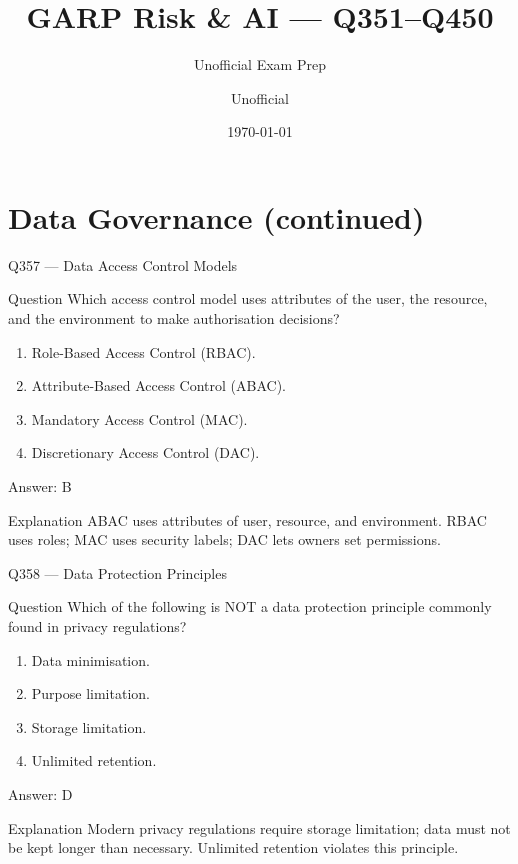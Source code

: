 \documentclass[aspectratio=169,8pt]{beamer}
\title[GARP RAI]{GARP Risk \& AI --- Q351--Q450}
\subtitle{Unofficial Exam Prep}
\author{Unofficial}
\date{\today}
\begin{document}
	
	\begin{frame}
		\titlepage
	\end{frame}
	
	\section{Data Governance (continued)}
	



	



	\begin{frame}{Q357 --- Data Access Control Models}
		\begin{block}{Question}
			Which access control model uses attributes of the user, the resource, and the environment to make authorisation decisions?
			\begin{enumerate}
				\item Role-Based Access Control (RBAC).
				\item Attribute-Based Access Control (ABAC).
				\item Mandatory Access Control (MAC).
				\item Discretionary Access Control (DAC).
			\end{enumerate}
		\end{block}
		\begin{exampleblock}{Answer: B}\end{exampleblock}
		\begin{block}{Explanation}
			ABAC uses attributes of user, resource, and environment. RBAC uses roles; MAC uses security labels; DAC lets owners set permissions.
		\end{block}
	\end{frame}
	
	\begin{frame}{Q358 --- Data Protection Principles}
		\begin{block}{Question}
			Which of the following is NOT a data protection principle commonly found in privacy regulations?
			\begin{enumerate}
				\item Data minimisation.
				\item Purpose limitation.
				\item Storage limitation.
				\item Unlimited retention.
			\end{enumerate}
		\end{block}
		\begin{exampleblock}{Answer: D}\end{exampleblock}
		\begin{block}{Explanation}
			Modern privacy regulations require storage limitation; data must not be kept longer than necessary. Unlimited retention violates this principle.
		\end{block}
	\end{frame}
	
\end{document}
